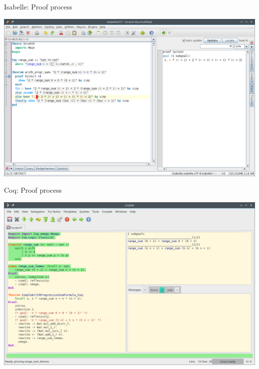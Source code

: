 \documentclass[aspectratio=169, 12pt, fleqn]{beamer}
\begin{document}
\begin{frame}[fragile]{Isabelle: Proof process} %
\begin{center}
  \includegraphics[scale=0.38]{img/isabelle_arith.png}
\end{center}
\end{frame}


\begin{frame}[fragile]{Coq: Proof process}
\begin{center}
  \includegraphics[scale=0.38]{img/coq_arith_1.png}
\end{center}
\end{frame}
\end{document}
